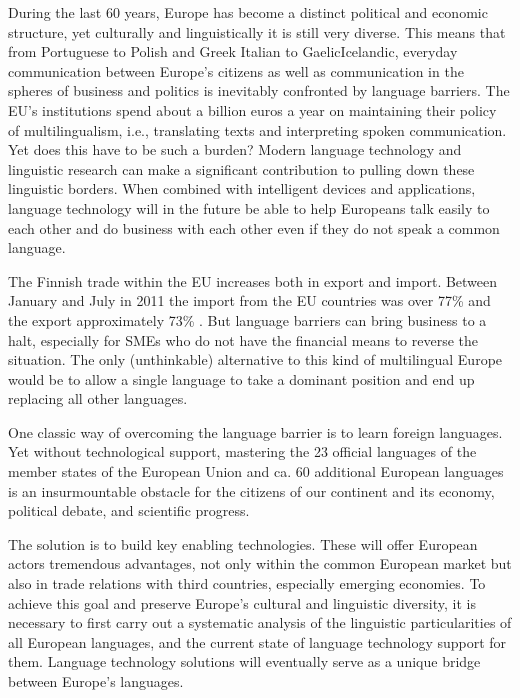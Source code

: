 \documentclass[]{../../metanetpaper}
\begin{document}
\begin{multicols}{2}

During the last 60 years, Europe has become a distinct political and
economic structure, yet culturally and linguistically it is still very
diverse. This means that from Portuguese to Polish and Greek Italian
to GaelicIcelandic, everyday communication between Europe’s citizens
as well as communication in the spheres of business and politics is
inevitably confronted by language barriers. The EU’s institutions
spend about a billion euros a year on maintaining their policy of
multilingualism, i.e., translating texts and interpreting spoken
communication. Yet does this have to be such a burden?  Modern
language technology and linguistic research can make a significant
contribution to pulling down these linguistic borders. When combined
with intelligent devices and applications, language technology will in
the future be able to help Europeans talk easily to each other and do
business with each other even if they do not speak a common language.

The Finnish trade within the EU increases both in export and
import. Between January and July in 2011 the import from the EU
countries was over 77\% and the export approximately 73\%
\cite{SVT}. But language barriers can bring business to a halt,
especially for SMEs who do not have the financial means to reverse the
situation. The only (unthinkable) alternative to this kind of
multilingual Europe would be to allow a single language to take a
dominant position and end up replacing all other languages.

One classic way of overcoming the language barrier is to learn foreign
languages. Yet without technological support, mastering the 23
official languages of the member states of the European Union and
ca. 60 additional European languages is an insurmountable obstacle for
the citizens of our continent and its economy, political debate, and
scientific progress.

The solution is to build key enabling technologies. These will offer European
actors tremendous advantages, not only within the common European market but
also in trade relations with third countries, especially emerging economies. To
achieve this goal and preserve Europe’s cultural and linguistic diversity, it
is necessary to first carry out a systematic analysis of the linguistic
particularities of all European languages, and the current state of language
technology support for them. Language technology solutions will eventually
serve as a unique bridge between Europe’s languages.


\end{multicols}
\end{document}
